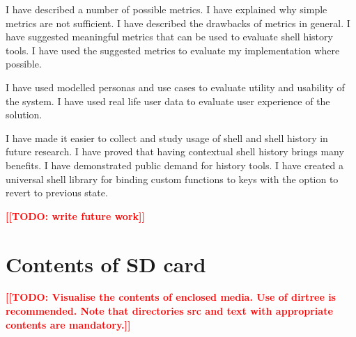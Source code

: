 \documentclass[thesis=M,english]{FITthesis}[2012/10/20]
\newcommand{\todotext}[1]{\textcolor{red}{\textbf{[[#1]]}}}
\begin{document}
\begin{conclusion}
\par I have described a number of possible metrics. I have explained why simple metrics are not sufficient. I have described the drawbacks of metrics in general. I have suggested meaningful metrics that can be used to evaluate shell history tools. I have used the suggested metrics to evaluate my implementation where possible. 

\par I have used modelled personas and use cases to evaluate utility and usability of the system.
I have used real life user data to evaluate user experience of the solution.


I have made it easier to collect and study usage of shell and shell history in future research.
I have proved that having contextual shell history brings many benefits. 
I have demonstrated public demand for history tools. 
I have created a universal shell library for binding custom functions to keys with the option to revert to previous state. 




\todotext{TODO: write future work}

\end{conclusion}




\appendix


\chapter{Contents of SD card}\label{app:SDcontent}

\todotext{TODO: Visualise the contents of enclosed media. Use of dirtree is recommended. Note that directories src and text with appropriate contents are mandatory.}


\begin{figure}
\end{figure}
\end{document}
